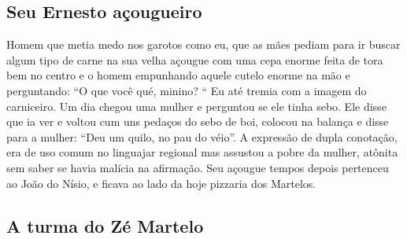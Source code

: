 \documentclass[12pt,brazil,]{book}
\begin{document}
\subsection{Seu Ernesto açougueiro}\label{seu-ernesto-auxe7ougueiro}

Homem que metia medo nos garotos como eu, que as mães pediam para ir
buscar algum tipo de carne na sua velha açougue com uma cepa enorme
feita de tora bem no centro e o homem empunhando aquele cutelo enorme na
mão e perguntando: ``O que você qué, minino? `` Eu até tremia com a
imagem do carniceiro. Um dia chegou uma mulher e perguntou se ele tinha
sebo. Ele disse que ia ver e voltou cum uns pedaços do sebo de boi,
colocou na balança e disse para a mulher: ``Deu um quilo, no pau do
véio''. A expressão de dupla conotação, era de uso comum no linguajar
regional mas assustou a pobre da mulher, atônita sem saber se havia
malícia na afirmação. Seu açougue tempos depois pertenceu ao João do
Nísio, e ficava ao lado da hoje pizzaria dos Martelos.

\subsection{A turma do Zé Martelo}\label{a-turma-do-zuxe9-martelo}
\end{document}
